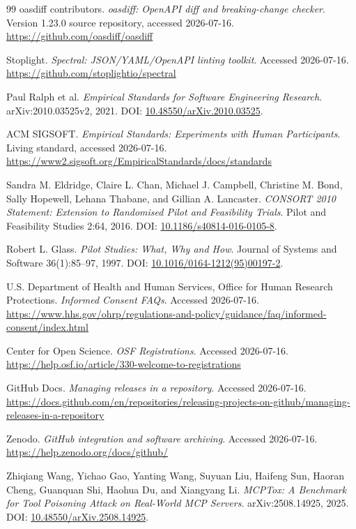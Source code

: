 \documentclass[11pt,letterpaper]{article}
\begin{document}
\begin{thebibliography}{99}
oasdiff contributors. \emph{oasdiff: OpenAPI diff and breaking-change checker}. Version 1.23.0 source repository, accessed 2026-07-16.
\url{https://github.com/oasdiff/oasdiff}

Stoplight. \emph{Spectral: JSON/YAML/OpenAPI linting toolkit}. Accessed 2026-07-16.
\url{https://github.com/stoplightio/spectral}

Paul Ralph et al. \emph{Empirical Standards for Software Engineering Research}. arXiv:2010.03525v2, 2021. DOI: \href{https://doi.org/10.48550/arXiv.2010.03525}{10.48550/arXiv.2010.03525}.

ACM SIGSOFT. \emph{Empirical Standards: Experiments with Human Participants}. Living standard, accessed 2026-07-16.
\url{https://www2.sigsoft.org/EmpiricalStandards/docs/standards}

Sandra M. Eldridge, Claire L. Chan, Michael J. Campbell, Christine M. Bond, Sally Hopewell, Lehana Thabane, and Gillian A. Lancaster. \emph{CONSORT 2010 Statement: Extension to Randomised Pilot and Feasibility Trials}. Pilot and Feasibility Studies 2:64, 2016. DOI: \href{https://doi.org/10.1186/s40814-016-0105-8}{10.1186/s40814-016-0105-8}.

Robert L. Glass. \emph{Pilot Studies: What, Why and How}. Journal of Systems and Software 36(1):85--97, 1997. DOI: \href{https://doi.org/10.1016/0164-1212(95)00197-2}{10.1016/0164-1212(95)00197-2}.

U.S. Department of Health and Human Services, Office for Human Research Protections. \emph{Informed Consent FAQs}. Accessed 2026-07-16.
\url{https://www.hhs.gov/ohrp/regulations-and-policy/guidance/faq/informed-consent/index.html}

Center for Open Science. \emph{OSF Registrations}. Accessed 2026-07-16.
\url{https://help.osf.io/article/330-welcome-to-registrations}

GitHub Docs. \emph{Managing releases in a repository}. Accessed 2026-07-16.
\url{https://docs.github.com/en/repositories/releasing-projects-on-github/managing-releases-in-a-repository}

Zenodo. \emph{GitHub integration and software archiving}. Accessed 2026-07-16.
\url{https://help.zenodo.org/docs/github/}

Zhiqiang Wang, Yichao Gao, Yanting Wang, Suyuan Liu, Haifeng Sun, Haoran Cheng, Guanquan Shi, Haohua Du, and Xiangyang Li. \emph{MCPTox: A Benchmark for Tool Poisoning Attack on Real-World MCP Servers}. arXiv:2508.14925, 2025.
DOI: \href{https://doi.org/10.48550/arXiv.2508.14925}{10.48550/arXiv.2508.14925}.


\end{thebibliography}
\end{document}
